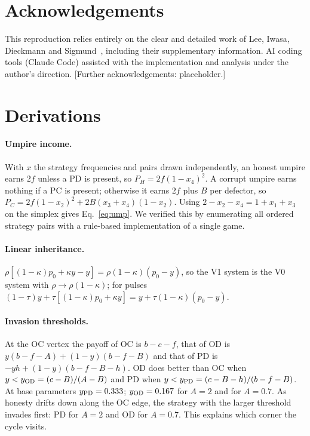 \documentclass[11pt]{article}
\begin{document}
\section*{Acknowledgements}
This reproduction relies entirely on the clear and detailed work of Lee, Iwasa, Dieckmann and
Sigmund~\cite{lee2019social}, including their supplementary information. AI coding tools
(Claude Code) assisted with the implementation and analysis under the author's direction.
[Further acknowledgements: placeholder.]




\appendix
\renewcommand{\thefigure}{S\arabic{figure}}
\setcounter{figure}{0}
\section{Derivations}\label{app:deriv}

\paragraph{Umpire income.} With $x$ the strategy frequencies and pairs drawn independently, an
honest umpire earns $2f$ unless a PD is present, so $P_H=2f(1-x_4)^2$. A corrupt umpire earns
nothing if a PC is present; otherwise it earns $2f$ plus $B$ per defector, so
$P_C=2f(1-x_2)^2+2B(x_3+x_4)(1-x_2)$. Using $2-x_2-x_4=1+x_1+x_3$ on the simplex gives
Eq.~\eqref{eq:ump}. We verified this by enumerating all ordered strategy pairs with a rule-based
implementation of a single game.

\paragraph{Linear inheritance.} $\rho[(1-\kappa)p_0+\kappa y-y]=\rho(1-\kappa)(p_0-y)$, so the V1
system is the V0 system with $\rho\to\rho(1-\kappa)$; for pulses
$(1-\tau)y+\tau[(1-\kappa)p_0+\kappa y]=y+\tau(1-\kappa)(p_0-y)$.

\paragraph{Invasion thresholds.} At the OC vertex the payoff of OC is $b-c-f$, that of OD is
$y(b-f-A)+(1-y)(b-f-B)$ and that of PD is $-yh+(1-y)(b-f-B-h)$. OD does better than OC when
$y<y_{\rm OD}=(c-B)/(A-B)$ and PD when $y<y_{\rm PD}=(c-B-h)/(b-f-B)$. At base parameters
$y_{\rm PD}=0.333$; $y_{\rm OD}=0.167$ for $A=2$ and \yODB{} for $A=0.7$. As honesty drifts down
along the OC edge, the strategy with the larger threshold invades first: PD for $A=2$ and OD for
$A=0.7$. This explains which corner the cycle visits.
\end{document}
